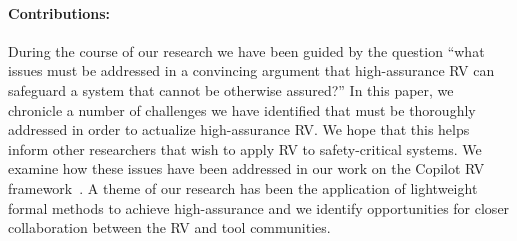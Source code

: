 \paragraph{Contributions:} During the course of our research we have
been guided by the question ``what issues must be addressed in a
convincing argument that high-assurance RV can safeguard a system that
cannot be otherwise assured?''  In this paper, we chronicle a number
of challenges we have identified that must be thoroughly addressed in
order to actualize high-assurance RV.  We hope that this helps inform
other researchers that wish to apply RV to safety-critical
systems.   We
examine how these issues have been addressed in our work on  the
Copilot RV framework~\cite{copilot, pike-isse-13}. A theme of our research has been the
application of lightweight formal methods to achieve high-assurance
and we identify opportunities for closer collaboration between the RV
and tool communities.

